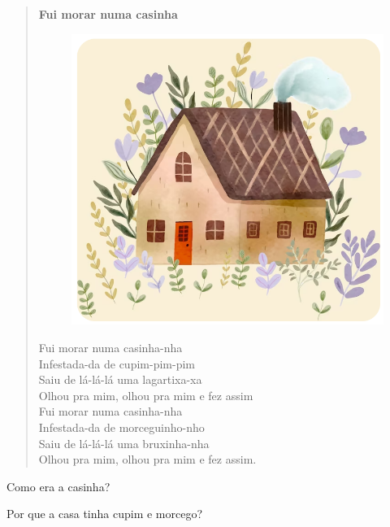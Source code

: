 \begin{myquote}
\begin{verse}
\textbf{Fui morar numa casinha}
\begin{figure}[H]
\centering
\includegraphics[width=.6\textwidth]{media/image198.png}
\end{figure}
Fui morar numa casinha-nha\\
Infestada-da de cupim-pim-pim\\
Saiu de lá-lá-lá uma lagartixa-xa\\
Olhou pra mim, olhou pra mim e fez assim\\
Fui morar numa casinha-nha\\
Infestada-da de morceguinho-nho\\
Saiu de lá-lá-lá uma bruxinha-nha\\
Olhou pra mim, olhou pra mim e fez assim.
\end{verse}

\end{myquote}

\begin{escolha}
\item Como era a casinha?\\

\item Por que a casa tinha cupim e morcego?\\
\end{escolha}

